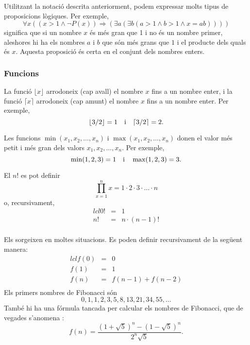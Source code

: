 Utilitzant la notació descrita anteriorment,
podem expressar molts tipus de proposicions lògiques.
Per exemple,
\[\forall x ((x>1 \land \lnot P(x)) \Rightarrow (\exists a (\exists b (a > 1 \land b > 1 \land x = ab))))\]
significa que si un nombre $x$ és més gran que 1
i no és un nombre primer,
aleshores hi ha els nombres $a$ i $b$
que s\'on més grans que $1$ i el producte dels quals \'es $x$.
Aquesta proposició és certa en el conjunt dels nombres enters.

\subsubsection{Funcions}

La funció $\lfloor x \rfloor$ arrodoneix (cap avall) el nombre $x$
fins a un nombre enter, i la funció
$\lceil x \rceil$ arrodoneix (cap amunt) el nombre $x$
fins a un nombre enter. Per exemple,
\[ \lfloor 3/2 \rfloor = 1 \hspace{10px} \textrm{i} \hspace{10px} \lceil 3/2 \rceil = 2.\]

Les funcions $\min(x_1,x_2,\ldots,x_n)$
i $\max(x_1,x_2,\ldots,x_n)$
donen el valor més petit i més gran dels valors
$x_1,x_2,\ldots,x_n$.
Per exemple,
\[ \min(1,2,3)=1 \hspace{10px} \textrm{i} \hspace{10px} \max(1,2,3)=3.\]


El  $n!$ es pot definir
\[\prod_{x=1}^n x = 1 \cdot 2 \cdot 3 \cdot \ldots \cdot n\]
o, recursivament,
\[
\begin{matrix}{lcl}
0! & = & 1 \\
n! & = & n \cdot (n-1)! \\
\end{matrix}
\]


Els 
sorgeixen en moltes situacions.
Es poden definir recursivament de la següent manera:
\[
\begin{matrix}{lcl}
f(0) & = & 0 \\
f(1) & = & 1 \\
f(n) & = & f(n-1)+f(n-2) \\
\end{matrix}
\]
Els primers nombres de Fibonacci són
\[0, 1, 1, 2, 3, 5, 8, 13, 21, 34, 55, \ldots\]
També hi ha una fórmula tancada
per calcular els nombres de Fibonacci, que de vegades s'anomena
 :
\[f(n)=\frac{(1 + \sqrt{5})^n - (1-\sqrt{5})^n}{2^n \sqrt{5}}.\]

